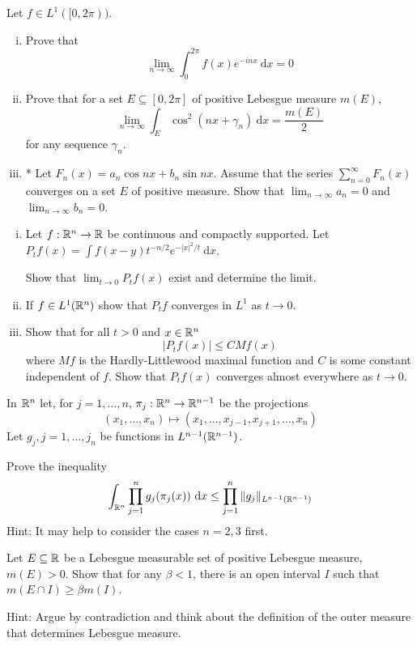 \begin{problem}
  Let $f \in L^1([0, 2\pi))$.
  \begin{enumerate}[(i)]
    \item Prove that
    \[\lim_{n\to\infty} \int_0^{2\pi} f(x) e^{-inx} \ \mathrm{d}x = 0\]
    \item Prove that for a set $E \subseteq [0, 2\pi]$ of positive Lebesgue measure $m(E)$,
    \[\lim_{n\to\infty}\int_E \cos^2(nx + \gamma_n)\ \mathrm{d}x = \frac{m(E)}{2}\]
    for any sequence $\gamma_n$.
    \item * Let $F_n(x) = a_n \cos nx + b_n \sin nx$. Assume that the series
    $\sum_{n=0}^\infty F_n(x)$ converges on a set $E$ of positive measure. Show
    that $\lim_{n\to\infty} a_n = 0$ and $\lim_{n\to\infty} b_n = 0$.
  \end{enumerate}
\end{problem}

\begin{problem}
  \begin{enumerate}[(i)]
    \item Let $f: \mathbb R^n \to \mathbb R$ be continuous and compactly supported. 
    Let $P_tf(x) = \int f(x-y)t^{-n/2}e^{-|x|^2/t} \ \mathrm{d}x$.

    Show that $\lim_{t\to 0} P_tf(x)$ exist and determine the limit.
    \item If $f \in L^1(\mathbb R^n)$ show that $P_tf$ converges in $L^1$ as $t\to 0$.
    \item Show that for all $t> 0$ and $x \in \mathbb R^n$
    \[|P_tf(x)| \le CM f(x)\]
    where $Mf$ is the Hardly-Littlewood maximal function and $C$ is some constant independent of $f$.
    Show that $P_tf(x)$ converges almost everywhere as $t\to 0$.
  \end{enumerate}
\end{problem}

\begin{problem}
  In $\mathbb R^n$ let, for $j = 1, \dotsc, n$, $\pi_j: \mathbb R^n \to \mathbb R^{n-1}$ be the projections
  \[(x_1, \dotsc, x_n) \mapsto (x_1, \dotsc, x_{j-1}, x_{j+1}, \dotsc, x_n)\]
  Let $g_j, j=1, \dotsc,j_n$ be functions in $L^{n-1}(\mathbb R^{n-1})$.

  Prove the inequality
  \[\int_{\mathbb R^n} \prod_{j=1}^n g_j(\pi_j(x))\ \mathrm{d}x \le \prod_{j=1}^n \|g_j\|_{L^{n-1}(\mathbb R^{n-1})}\]
  Hint: It may help to consider the cases $n=2,3$ first.
\end{problem}

\begin{problem}
  Let $E \subseteq \mathbb R$ be a Lebesgue measurable set of positive Lebesgue measure, $m(E) > 0$. 
  Show that for any $\beta < 1$, there is an open interval $I$ such that $m(E \cap I) \ge \beta m(I)$.

  Hint: Argue by contradiction and think about the definition of the outer measure
  that determines Lebesgue measure.
\end{problem}

